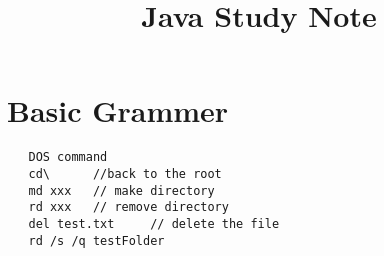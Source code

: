 \documentclass[UTF8]{article}
\begin{document}
\title{Java Study Note}
 
\section{Basic Grammer}



\begin{lstlisting}
   DOS command
   cd\      //back to the root
   md xxx   // make directory
   rd xxx   // remove directory
   del test.txt     // delete the file
   rd /s /q testFolder
\end{lstlisting}
\end{document}
